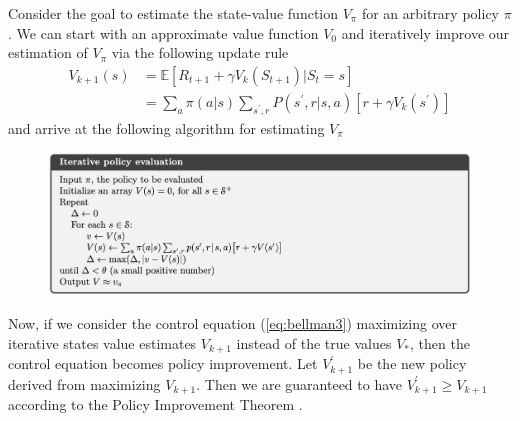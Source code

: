 \documentclass[12pt]{report}
\begin{document}
Consider the goal to estimate the state-value function $V_\pi$ for an arbitrary policy $\pi$. We can start with an approximate value function $V_0$ and iteratively improve our estimation of $V_\pi$ via the following update rule
\begin{align}
    V_{k+1}(s) &= \mathbb{E}[R_{t+1}+\gamma V_k(S_{t+1})|S_t=s]\\
    &= \sum_a \pi(a|s)\sum_{s^\prime,r}P(s^\prime, r|s,a)[r+\gamma V_k(s^\prime)]
\end{align}
and arrive at the following algorithm \cite{sutton2018reinforcement} for estimating $V_\pi$
\begin{figure}[H]
    \center
    \includegraphics[width=0.8\linewidth]{figs/policy-eval.png}
    \label{fig:policy-eval}
\end{figure}
Now, if we consider the control equation (\ref{eq:bellman3}) maximizing over iterative states value estimates $V_{k+1}$ instead of the true values $V_*$, then the control equation becomes policy improvement. Let $V_{k+1}^\prime$ be the new policy derived from maximizing $V_{k+1}$. Then we are guaranteed to have $V_{k+1}^\prime \ge V_{k+1}$ according to the Policy Improvement Theorem \cite{sutton2018reinforcement}.\\
\end{document}
